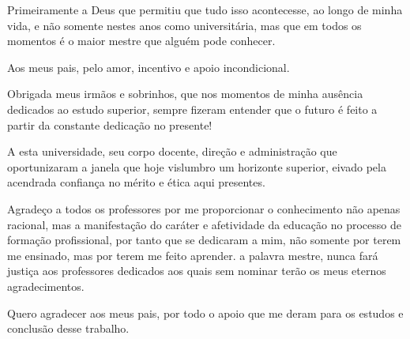 Primeiramente a Deus que permitiu que tudo isso acontecesse, ao longo de minha vida, e não somente nestes anos como universitária, mas que em todos os momentos é o maior mestre que alguém pode conhecer.
	
Aos meus pais, pelo amor, incentivo e apoio incondicional.

Obrigada meus irmãos e sobrinhos, que nos momentos de minha ausência dedicados ao estudo superior, sempre fizeram entender que o futuro é feito a partir da constante dedicação no presente!

A esta universidade, seu corpo docente, direção e administração que oportunizaram a janela que hoje vislumbro um horizonte superior, eivado pela acendrada confiança no mérito e ética aqui presentes.

Agradeço a todos os professores por me proporcionar o conhecimento não apenas racional, mas a manifestação do caráter e afetividade da educação no processo de formação profissional, por tanto que se dedicaram a mim, não somente por terem me ensinado, mas por terem me feito aprender. a palavra mestre, nunca fará justiça aos professores dedicados aos quais sem nominar terão os meus eternos agradecimentos.

Quero agradecer aos meus pais, por todo o apoio que me deram para os estudos e conclusão desse trabalho. 